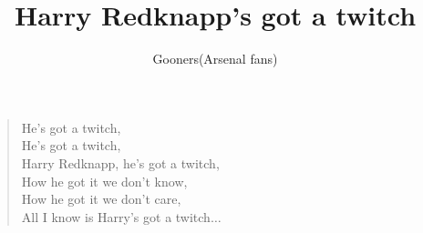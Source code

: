 \documentclass[a4paper,12pt]{article}
\title{Harry Redknapp's got a twitch}
\author{Gooners(Arsenal fans)}
\date{}
\begin{document}
	
	\maketitle
	
	\begin{verse}
		
		He's got a twitch, \\
		He's got a twitch, \\
		Harry Redknapp, he's got a twitch, \\
		How he got it we don't know, \\
		How he got it we don't care, \\
		All I know is Harry's got a twitch$\ldots$
		
	\end{verse}
	
\end{document}
